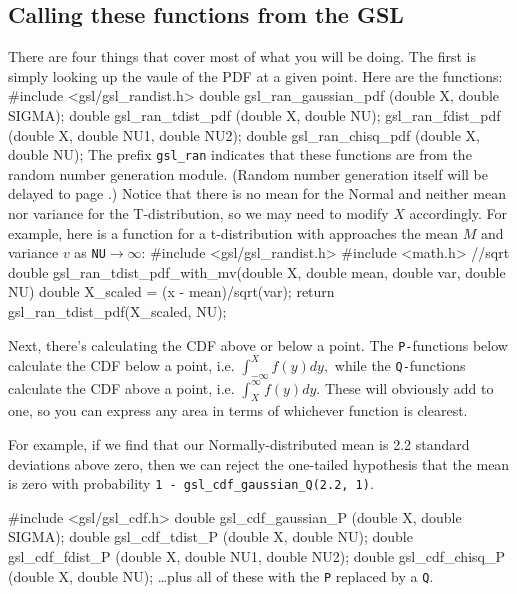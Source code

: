 \subsection{Calling these functions from the GSL}
There are four things that cover most of what you will be doing. 
The first is simply looking up the vaule of the PDF at a given point. Here are the functions:
#include <gsl/gsl_randist.h>
double gsl_ran_gaussian_pdf (double X, double SIGMA);
double gsl_ran_tdist_pdf (double X, double NU);
gsl_ran_fdist_pdf (double X, double NU1, double NU2);
double gsl_ran_chisq_pdf (double X, double NU);
The prefix {\tt gsl\_ran} indicates that these functions are from the
random number generation module. (Random number generation itself will be delayed to page
\pageref{randomnumbers}.) Notice that there is no mean for the Normal and neither mean nor variance
for the T-distribution, so we may need to modify $X$ accordingly. For
example, here is a function for a t-distribution with approaches the
mean $M$ and variance $v$ as {\tt NU}$\to \infty$:
#include <gsl/gsl_randist.h>
#include <math.h>      //sqrt
double gsl_ran_tdist_pdf_with_mv(double X, double mean,
                               double var, double NU){
    double X_scaled = (x - mean)/sqrt(var);
    return gsl_ran_tdist_pdf(X_scaled, NU);
}

Next, there's calculating the CDF above or below a point. 
The {\tt P-}functions below calculate the CDF below a point, i.e.
$\int_{-\infty}^X f(y) dy,$
while the {\tt Q-}functions calculate the CDF above a point, i.e.
$\int^{\infty}_X f(y) dy.$
These will obviously add to one, so you can express any area in terms of whichever function is clearest.

For example, if we find that our Normally-distributed mean is 2.2 standard
deviations above zero, then we can reject the one-tailed hypothesis that
the mean is zero with probability {\tt 1 - gsl\_cdf\_gaussian\_Q(2.2, 1)}.

#include <gsl/gsl_cdf.h>
double gsl_cdf_gaussian_P (double X, double SIGMA);
double gsl_cdf_tdist_P (double X, double NU);
double gsl_cdf_fdist_P (double X, double NU1, double NU2);
double gsl_cdf_chisq_P (double X, double NU);
\dots plus all of these with the {\tt P} replaced by a {\tt Q}.


